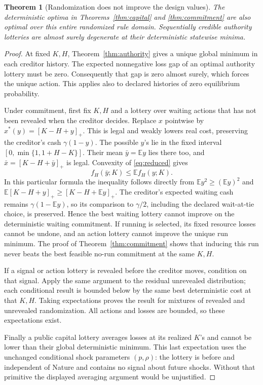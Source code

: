 \documentclass[11pt,a4paper]{article}
\numberwithin{equation}{section}
\newtheorem{theorem}{Theorem}[section]
\theoremstyle{definition}
\newcommand{\E}{\mathbb E}
\begin{document}
\begin{theorem}[Randomization does not improve the design values]\label{thm:lottery}
The deterministic optima in Theorems~\ref{thm:capital} and
\ref{thm:commitment} are also optimal over this entire randomized rule
domain. Sequentially credible authority lotteries are almost surely
degenerate at their deterministic statewise minima.
\end{theorem}
\begin{proof}
At fixed \(K,H\), Theorem~\ref{thm:authority} gives a unique global
minimum in each creditor history. The expected nonnegative loss gap
of an optimal authority lottery must be zero. Consequently that gap
is zero almost surely, which forces the unique action. This applies
also to declared histories of zero equilibrium probability.

Under commitment, first fix \(K,H\) and a lottery over waiting actions
that has not been revealed when the creditor decides. Replace \(x\)
pointwise by \(x^*(y)=[K-H+y]_+\). This is legal and weakly lowers
real cost, preserving the creditor's cash \(\gamma(1-y)\).
The possible \(y\)'s lie in the fixed interval
\([0,\min\{1,1+H-K\}]\). Their mean \(\bar y=\E y\) lies there too,
and \(\bar x=[K-H+\bar y]_+\) is legal. Convexity of
\eqref{eq:reduced} gives
\[
 f_H(\bar y;K)\le\E f_H(y;K).
\]
In this particular formula the inequality follows directly from
\(\E y^2\ge(\E y)^2\) and
\(\E[K-H+y]_+\ge[K-H+\E y]_+\).
The creditor's expected waiting cash remains
\(\gamma(1-\E y)\), so its comparison to \(\gamma/2\), including
the declared wait-at-tie choice, is preserved. Hence the best waiting
lottery cannot improve on the deterministic waiting commitment.
If running is selected, its fixed resource losses cannot be undone,
and an action lottery cannot improve the unique run minimum.
The proof of Theorem~\ref{thm:commitment} shows that inducing this
run never beats the best feasible no-run commitment at the same \(K,H\).

If a signal or action lottery is revealed before the creditor moves,
condition on that signal. Apply the same argument to the residual
unrevealed distribution; each conditional result is bounded below by
the same best deterministic cost at that \(K,H\). Taking expectations
proves the result for mixtures of revealed and unrevealed randomization.
All actions and losses are bounded, so these expectations exist.

Finally a public capital lottery averages losses at its realized
\(K\)'s and cannot be lower than their global deterministic minimum.
This last expectation uses the unchanged conditional shock parameters
\((p,\rho)\): the lottery is before and independent of Nature and
contains no signal about future shocks. Without that primitive the
displayed averaging argument would be unjustified.
\end{proof}
\end{document}
